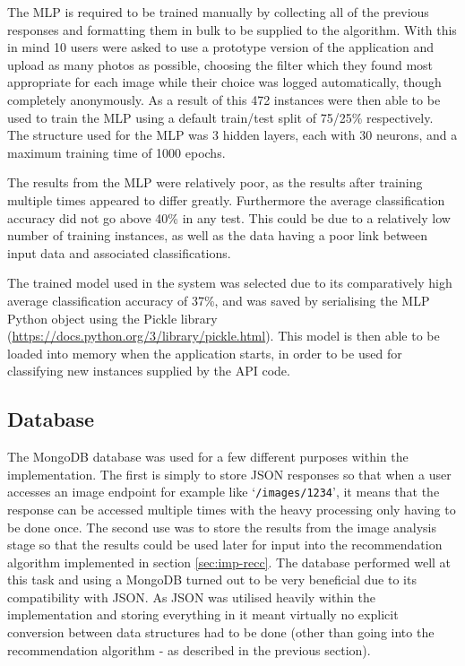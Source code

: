 \documentclass[a4paper,12pt]{report}
\begin{document}
      The MLP is required to be trained manually by collecting all of the previous responses and formatting them in bulk to be supplied to the algorithm. With this in mind 10 users were asked to use a prototype version of the application and upload as many photos as possible, choosing the filter which they found most appropriate for each image while their choice was logged automatically, though completely anonymously. As a result of this 472 instances were then able to be used to train the MLP using a default train/test split of 75/25\% respectively. The structure used for the MLP was 3 hidden layers, each with 30 neurons, and a maximum training time of 1000 epochs.

      The results from the MLP were relatively poor, as the results after training multiple times appeared to differ greatly. Furthermore the average classification accuracy did not go above 40\% in any test. This could be due to a relatively low number of training instances, as well as the data having a poor link between input data and associated classifications.

      The trained model used in the system was selected due to its comparatively high average classification accuracy of 37\%, and was saved by serialising the MLP Python object using the Pickle library (\url{https://docs.python.org/3/library/pickle.html}). This model is then able to be loaded into memory when the application starts, in order to be used for classifying new instances supplied by the API code.

    \subsection{Database}
      The MongoDB database was used for a few different purposes within the implementation. The first is simply to store JSON responses so that when a user accesses an image endpoint for example like ‘\texttt{/images/1234}’, it means that the response can be accessed multiple times with the heavy processing only having to be done once. The second use was to store the results from the image analysis stage so that the results could be used later for input into the recommendation algorithm implemented in section \ref{sec:imp-recc}. The database performed well at this task and using a MongoDB turned out to be very beneficial due to its compatibility with JSON. As JSON was utilised heavily within the implementation and storing everything in it meant virtually no explicit conversion between data structures had to be done (other than going into the recommendation algorithm - as described in the previous section).
\end{document}
